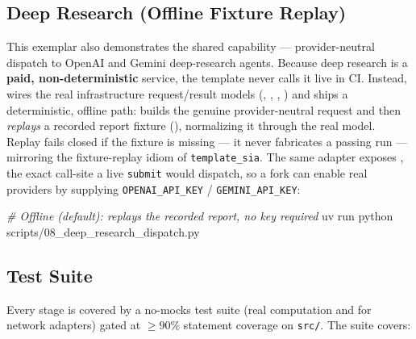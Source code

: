 \documentclass[
  english,
]{article}
\newenvironment{Shaded}{}{}
\newcommand{\CommentTok}[1]{\textcolor[rgb]{0.38,0.63,0.69}{\textit{#1}}}
\newcommand{\ExtensionTok}[1]{#1}
\newcommand{\NormalTok}[1]{#1}
\begin{document}
\subsection{Deep Research (Offline Fixture
Replay)}\label{deep-research-offline-fixture-replay}

This exemplar also demonstrates the shared
 capability ---
provider-neutral dispatch to OpenAI and Gemini deep-research agents.
Because deep research is a \textbf{paid, non-deterministic} service, the
template never calls it live in CI. Instead,
 wires the real
infrastructure request/result models (,
, ,
) and ships a deterministic, offline path:
 builds the genuine
provider-neutral request and then \emph{replays} a recorded report
fixture (),
normalizing it through the real  model.
Replay fails closed if the fixture is missing --- it never fabricates a
passing run --- mirroring the fixture-replay idiom of
\texttt{template\_sia}. The same adapter exposes
, the exact call-site a live
\texttt{submit} would dispatch, so a fork can enable real providers by
supplying \texttt{OPENAI\_API\_KEY} / \texttt{GEMINI\_API\_KEY}:

\begin{Shaded}
\begin{Highlighting}[]
\CommentTok{\# Offline (default): replays the recorded report, no key required}
\ExtensionTok{uv}\NormalTok{ run python scripts/08\_deep\_research\_dispatch.py}
\end{Highlighting}
\end{Shaded}

\subsection{Test Suite}\label{test-suite}

Every stage is covered by a no-mocks test suite (real computation and
 for network adapters) gated at \(\geq 90\%\)
statement coverage on \texttt{src/}. The suite covers:
\end{document}
